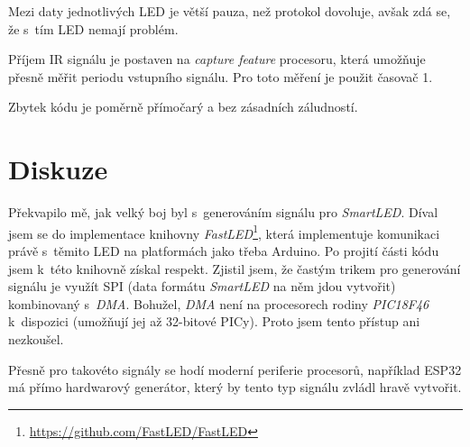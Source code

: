 \documentclass[12pt,a4paper]{article}
\begin{document}
Mezi daty jednotlivých LED je větší pauza, než protokol dovoluje, avšak zdá se,
že s~tím LED nemají problém.

Příjem IR signálu je postaven na \textit{capture feature} procesoru, která
umožňuje přesně měřit periodu vstupního signálu. Pro toto měření je použit
časovač 1.

Zbytek kódu je poměrně přímočarý a bez zásadních záludností.

\section{Diskuze}

Překvapilo mě, jak velký boj byl s~generováním signálu pro \textit{SmartLED}.
Díval jsem se do implementace knihovny
\textit{FastLED}\footnote{\url{https://github.com/FastLED/FastLED}}, která
implementuje komunikaci právě s~těmito LED na platformách jako třeba Arduino.
Po projití části kódu jsem k~této knihovně získal respekt. Zjistil jsem, že
častým trikem pro generování signálu je využít SPI (data formátu
\textit{SmartLED} na něm jdou vytvořit) kombinovaný s~\textit{DMA}. Bohužel,
\textit{DMA} není na procesorech rodiny \textit{PIC18F46} k~dispozici (umožňují
jej až 32-bitové PICy). Proto jsem tento přístup ani nezkoušel.

Přesně pro takovéto signály se hodí moderní periferie procesorů, například
ESP32 má přímo hardwarový generátor, který by tento typ signálu zvládl hravě
vytvořit.
\end{document}
